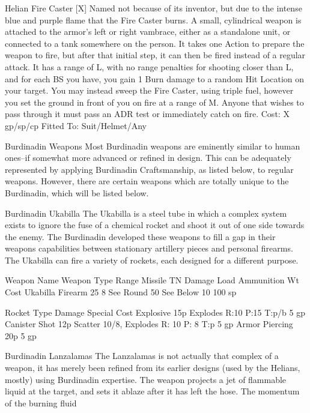 \documentclass[oneside,11pt,english]{book}
\begin{document}
 


Helian Fire Caster [X] 
Named not because of its inventor, but due to the intense blue and purple flame that the Fire Caster burns. 
A small, cylindrical weapon is attached to the armor’s left or right vambrace, either as a standalone unit, 
or connected to a tank somewhere on the person. It takes one Action to prepare the weapon to fire, but 
after that initial step, it can then be fired instead of a regular attack. It has a range of L, with no range 
penalties for shooting closer than L, and for each BS you have, you gain 1 Burn damage to a random Hit 
Location on your target. You may instead sweep the Fire Caster, using triple fuel, however you set the 
ground in front of you on fire at a range of M. Anyone that wishes to pass through it must pass an ADR 
test or immediately catch on fire. 
Cost: X gp/sp/cp 
Fitted To: Suit/Helmet/Any 

 

Burdinadin Weapons 
Most Burdinadin weapons are eminently similar to human ones--if somewhat more advanced or refined in 
design. This can be adequately represented by applying Burdinadin Craftsmanship, as listed below, to 
regular weapons. However, there are certain weapons which are totally unique to the Burdinadin, which 
will be listed below. 

 

Burdinadin Ukabilla 
The Ukabilla is a steel tube in which a complex system exists to ignore the fuse of a chemical rocket and 
shoot it out of one side towards the enemy. The Burdinadin developed these weapons to fill a gap in their 
weapons capabilities between stationary artillery pieces and personal firearms. The Ukabilla can fire a 
variety of rockets, each designed for a different purpose. 

 

 

Weapon Name Weapon Type Range Missile TN Damage Load Ammunition Wt Cost 
Ukabilla Firearm 25 8 See Round 50 See Below 10 100 sp 

 

 

Rocket Type Damage Special Cost 
Explosive 15p Explodes R:10 P:15 T:p/b 5 gp 
Canister Shot 12p Scatter 10/8, Explodes R: 10 P: 8 T:p 5 gp 
Armor Piercing 20p 5 gp 

 

 

 

Burdinadin Lanzalamas 
The Lanzalamas is not actually that complex of a weapon, it has merely been refined from its earlier 
designs (used by the Helians, mostly) using Burdinadin expertise. The weapon projects a jet of flammable 
liquid at the target, and sets it ablaze after it has left the hose. The momentum of the burning fluid 
\end{document}

